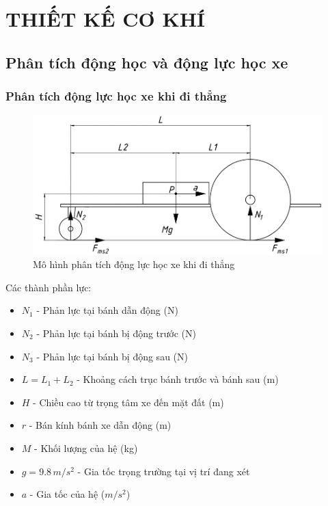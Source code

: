 \chapter{THIẾT KẾ CƠ KHÍ}
    \section{Phân tích động học và động lực học xe}
        \subsection{Phân tích động lực học xe khi đi thẳng}
            \begin{figure}[H]
                \centering
                \includegraphics[width=1\textwidth]{pictures/chapter3/c3_p1_StraightAnalysis.png}
                \caption{Mô hình phân tích động lực học xe khi đi thẳng}
                \label{fig:3.1}
            \end{figure}
            \hspace*{0.6cm}Các thành phần lực:
            \begin{itemize}
                \item $N_1$ - Phản lực tại bánh dẫn động (N)
                \item $N_2$ - Phản lực tại bánh bị động trước (N)
                \item $N_3$ - Phản lực tại bánh bị động sau (N)
                \item $L = L_1 + L_2$ - Khoảng cách trục bánh trước và bánh sau (m)
                \item $H$ - Chiều cao từ trọng tâm xe đến mặt đất (m)
                \item $r$ - Bán kính bánh xe dẫn động (m)
                \item $M$ - Khối lượng của hệ (kg)
                \item $g = 9.8 \, m/s^2$ - Gia tốc trọng trường tại vị trí đang xét
                \item $a$ - Gia tốc của hệ ($m/s^2$)
            \end{itemize}
